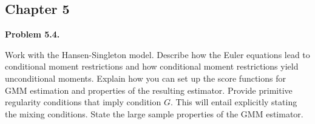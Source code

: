 \documentclass[11pt]{article}
\newenvironment{problem}[1]
    {\bigskip\noindent\textbf{Problem #1.}\par\setlength{\parindent}{0pt}}
    {\medskip}
\begin{document}

\newpage
\subsection*{Chapter 5}


\begin{problem}{5.4}
Work with the Hansen-Singleton model. Describe how the Euler equations lead to conditional moment restrictions and how conditional moment restrictions yield unconditional moments. Explain how you can set up the score functions for GMM estimation and properties of the resulting estimator. Provide primitive regularity conditions that imply condition $G.$ This will entail explicitly stating the mixing conditions. State the large sample properties of the GMM estimator. 
\end{problem}
\end{document}
